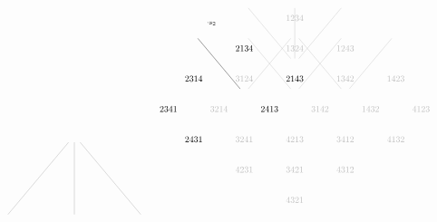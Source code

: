 \documentclass[12pt, reqno]{amsart}
\theoremstyle{definition}
\numberwithin{equation}{section} \numberwithin{figure}{section}
\numberwithin{table}{section}
\begin{document}
\begin{figure}[t]
\[{\begin{tikzpicture}[baseline = 0mm, scale = 0.8]
\draw [lightgray] (-\wtab+\wp,\htab-\hp) -- (-\wp, \hp);
\draw [lightgray] (0,\htab-\hp) -- (0, \hp);
\draw [lightgray] (\wtab-\wp,\htab-\hp) -- (\wp, \hp);
\end{tikzpicture}
}
\quad 
\scalebox{0.7}{
\begin{tikzpicture}[baseline = 0mm, scale = 0.8]
\node at (0,0) {\color{lightgray}$4321$};
\node at (-\wtab,1*\htab) {\color{lightgray}$4231$};
\node at (0,1*\htab) {\color{lightgray}$3421$};
\node at (\wtab,1*\htab) {\color{lightgray}$4312$};
\node at (-\wtab*2,2*\htab) {\color{black}$2431$};
\node at (-\wtab,2*\htab) {\color{lightgray}$3241$};
\node at (0,2*\htab) {\color{lightgray}$4213$};
\node at (\wtab,2*\htab) {\color{lightgray}$3412$};
\node at (\wtab*2,2*\htab) {\color{lightgray}$4132$};


\node at (-\wtab/2*5,3*\htab) {\color{black}$2341$};
\node at (-\wtab/2*3,3*\htab) {\color{lightgray}$3214$};
\node at (-\wtab/2,3*\htab) {\color{black}$2413$};
\node at (\wtab/2,3*\htab) {\color{lightgray}$3142$};
\node at (\wtab/2*3,3*\htab) {\color{lightgray}$1432$};
\node at (\wtab/2*5,3*\htab) {\color{lightgray}$4123$};
\node at (-\wtab*2,4*\htab) {\color{black}$2314$};
\node at (-\wtab,4*\htab) {\color{lightgray}$3124$};
\node at (0,4*\htab) {\color{black}$2143$};
\node at (\wtab,4*\htab) {\color{lightgray}$1342$};
\node at (\wtab*2,4*\htab) {\color{lightgray}$1423$};
\node at (-\wtab,5*\htab) {\color{black}$2134$};
\node at (0,5*\htab) {\color{lightgray}$1324$};
\node at (\wtab,5*\htab) {\color{lightgray}$1243$};
\node at (0,6*\htab) {\color{lightgray}$1234$};

\draw [lightgray] (-\wp,6*\htab-\hp) -- (-\wtab+\wp,5*\htab+\hp);
\draw [lightgray] (0,6*\htab-\hp) -- (0,5*\htab+\hp);
\draw [lightgray] (\wp, 6*\htab -\hp) -- (\wtab-\wp,5*\htab+\hp);

\draw [black] (-\wtab-\wp,5*\htab - \hp) -- (-\wtab*2+\wp,4*\htab+\hp);
\node at (-1.65*\wtab, 4.5*\htab+\hp) {\color{black}\footnotesize $\cdot s_2$};
\draw [lightgray] (\wp-\wtab,5*\htab - \hp) -- (0-\wp,4*\htab+\hp);
\draw [lightgray] (-\wp,5*\htab - \hp) -- (-\wtab+\wp,4*\htab+\hp);
\draw [lightgray] (\wp,5*\htab - \hp) -- (\wtab-\wp,4*\htab+\hp);
\draw [lightgray] (-\wp+\wtab,5*\htab - \hp) -- (0+\wp,4*\htab+\hp);
\draw [lightgray] (\wp+\wtab,5*\htab - \hp) -- (2*\wtab-\wp,4*\htab+\hp);


\end{tikzpicture}}\]
\end{figure}
\end{document}
